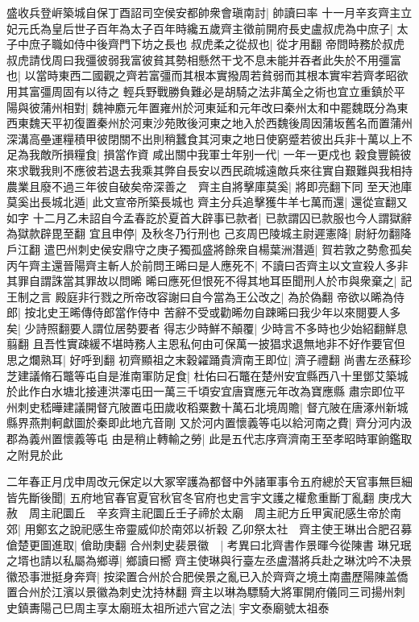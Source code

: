 盛收兵登㟁築城自保丁酉詔司空侯安都帥衆會瑱南討|{
	帥讀曰率}
十一月辛亥齊主立妃元氏為皇后世子百年為太子百年時纔五歲齊主徵前開府長史盧叔虎為中庶子|{
	太子中庶子職如侍中後齊門下坊之長也}
叔虎柔之從叔也|{
	從才用翻}
帝問時務於叔虎叔虎請伐周曰我彊彼弱我富彼貧其勢相懸然干戈不息未能并吞者此失於不用彊富也|{
	以當時東西二國觀之齊若富彊而其根本實撥周若貧弱而其根本實牢若齊孝昭欲用其富彊周固有以待之}
輕兵野戰勝負難必是胡騎之法非萬全之術也宜立重鎮於平陽與彼蒲州相對|{
	魏神䴥元年置雍州於河東延和元年改曰秦州太和中罷魏既分為東西東魏天平初復置秦州於河東沙苑敗後河東之地入於西魏後周因蒲坂舊名而置蒲州}
深溝高壘運糧積甲彼閉關不出則稍蠶食其河東之地日使窮蹙若彼出兵非十萬以上不足為我敵所損糧食|{
	損當作資}
咸出關中我軍士年别一代|{
	一年一更戍也}
穀食豐饒彼來求戰我則不應彼若退去我乘其弊自長安以西民疏城遠敵兵來往實自艱難與我相持農業且廢不過三年彼自破矣帝深善之　齊主自將擊庫莫奚|{
	將即亮翻下同}
至天池庫莫奚出長城北遁|{
	此文宣帝所築長城也}
齊主分兵追擊獲牛羊七萬而還|{
	還從宣翻又如字}
十二月乙未詔自今孟春訖於夏首大辟事已款者|{
	已款謂囚已款服也今人謂獄辭為獄款辟毘至翻}
宜且申停|{
	及秋冬乃行刑也}
己亥周巴陵城主尉遲憲降|{
	尉紆勿翻降戶江翻}
遣巴州刺史侯安鼎守之庚子獨孤盛將餘衆自楊葉洲潛遁|{
	賀若敦之勢愈孤矣}
丙午齊主還晉陽齊主斬人於前問王晞曰是人應死不|{
	不讀曰否齊主以文宣殺人多非其罪自謂誅當其罪故以問晞}
晞曰應死但恨死不得其地耳臣聞刑人於市與衆棄之|{
	記王制之言}
殿庭非行戮之所帝改容謝曰自今當為王公改之|{
	為於偽翻}
帝欲以晞為侍郎|{
	按北史王晞傳侍郎當作侍中}
苦辭不受或勸晞勿自踈晞曰我少年以來閱要人多矣|{
	少詩照翻要人謂位居勢要者}
得志少時鮮不顛覆|{
	少時言不多時也少始紹翻鮮息翦翻}
且吾性實疎緩不堪時務人主恩私何由可保萬一披猖求退無地非不好作要官但思之爛熟耳|{
	好呼到翻}
初齊顯祖之末穀糴踊貴濟南王即位|{
	濟子禮翻}
尚書左丞蘇珍芝建議脩石鼈等屯自是淮南軍防足食|{
	杜佑曰石鼈在楚州安宜縣西八十里鄧艾築城於此作白水塘北接連洪澤屯田一萬三千頃安宜唐寶應元年改為寶應縣}
肅宗即位平州刺史嵇曄建議開督亢陂置屯田歲收稻粟數十萬石北境周贍|{
	督亢陂在唐涿州新城縣界燕荆軻獻圖於秦即此地亢音剛}
又於河内置懷義等屯以給河南之費|{
	齊分河内汲郡為義州置懷義等屯}
由是稍止轉輸之勞|{
	此是五代志序齊濟南王至孝昭時軍餉鑑取之附見於此}


二年春正月戊申周改元保定以大冢宰護為都督中外諸軍事令五府總於天官事無巨細皆先斷後聞|{
	五府地官春官夏官秋官冬官府也史言宇文護之權愈重斷丁亂翻}
庚戌大赦　周主祀圜丘　辛亥齊主祀圜丘壬子禘於太廟　周主祀方丘甲寅祀感生帝於南郊|{
	用鄭玄之說祀感生帝靈威仰於南郊以祈穀}
乙卯祭太社　齊主使王琳出合肥召募傖楚更圖進取|{
	傖助庚翻}
合州刺史裴景徽　|{
	考異曰北齊書作景暉今從陳書}
琳兄珉之壻也請以私屬為鄉導|{
	鄉讀曰嚮}
齊主使琳與行臺左丞盧潛將兵赴之琳沈吟不决景徽恐事泄挺身奔齊|{
	按梁置合州於合肥侯景之亂已入於齊齊之境土南盡歷陽陳盖僑置合州於江濱以景徽為刺史沈持林翻}
齊主以琳為驃騎大將軍開府儀同三司揚州刺史鎮夀陽己巳周主享太廟班太祖所述六官之法|{
	宇文泰廟號太祖泰}


